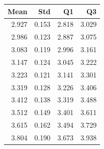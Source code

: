 \begin{tabular}{rrrr}
\toprule
Mean & Std & Q1 & Q3 \\
\midrule
2.927 & 0.153 & 2.818 & 3.029 \\
2.986 & 0.123 & 2.887 & 3.075 \\
3.083 & 0.119 & 2.996 & 3.161 \\
3.147 & 0.124 & 3.045 & 3.222 \\
3.223 & 0.121 & 3.141 & 3.301 \\
3.319 & 0.128 & 3.226 & 3.406 \\
3.412 & 0.138 & 3.319 & 3.488 \\
3.512 & 0.149 & 3.401 & 3.611 \\
3.615 & 0.162 & 3.494 & 3.729 \\
3.804 & 0.190 & 3.673 & 3.938 \\
\bottomrule
\end{tabular}
